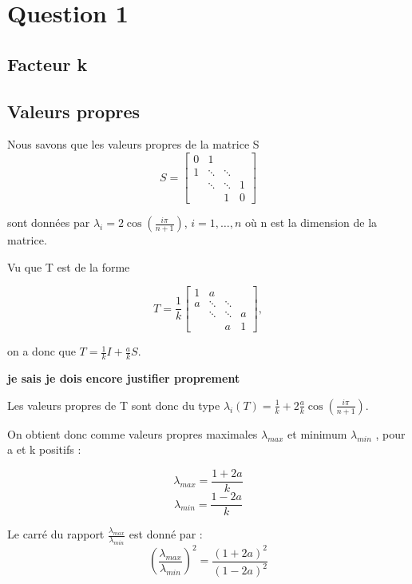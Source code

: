 \section{Question 1}

\subsection{Facteur k}

\subsection{Valeurs propres}
	Nous savons que les valeurs propres de la matrice S 
	$$
S = 	
 \left[
 \begin{array}{cccc}
    0 & 1 		& 			& \\
    1 & \ddots 	& \ddots 	& \\
      & \ddots 	& \ddots 	& 1 \\
      & 		& 1			& 0
  \end{array}
  \right]
$$

sont données par $\lambda_i = 2 \cos(\frac{i\pi}{n+1})$, $i= 1, \ldots , n$ où n est la dimension de la matrice.

Vu que T est de la forme 

$$
 T = \frac{1}{k}
 \left[
 \begin{array}{cccc}
    1 & a 		& 			& \\
    a & \ddots 	& \ddots 	& \\
      & \ddots 	& \ddots 	& a \\
      & 		& a			& 1
  \end{array}
  \right] ,
$$

on a donc que $T = \frac{1}{k} I + \frac{a}{k} S$.

\textbf{je sais je dois encore justifier proprement}

Les valeurs propres de T sont donc du type $\lambda_i(T) = \frac{1}{k} + 2 \frac{a}{k} \cos(\frac{i\pi}{n+1})$.

On obtient donc comme valeurs propres maximales $\lambda_{max}$ et minimum $\lambda_{min}$ , pour a et k positifs : 

	$$\lambda_{max} =  \frac{1+2a}{k} $$
	$$\lambda_{min} =  \frac{1-2a}{k} $$
	
Le carré du rapport $\frac{\lambda_{max}}{\lambda_{min}}$ est donné par :
\begin{equation}
	(\frac{\lambda_{max}}{\lambda_{min}})^2 = \frac{(1+2a)^2}{(1-2a)^2}
\end{equation}
	

